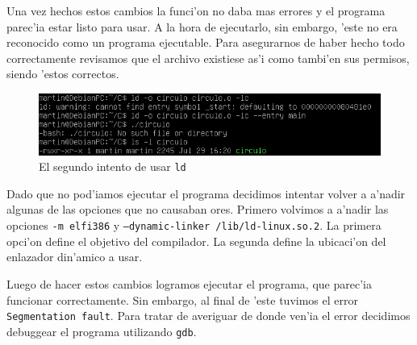\documentclass[11pt]{article}
\begin{document}
		
		Una vez hechos estos cambios la funci'on no daba mas errores y el programa parec'ia estar listo para usar. A la hora de ejecutarlo, sin embargo, 'este no era reconocido como un programa ejecutable. Para asegurarnos de haber hecho todo correctamente revisamos que el archivo existiese as'i como tambi'en sus permisos, siendo 'estos correctos.
		
		\begin{figure}[H]
			\centering
			\includegraphics[width=.9\linewidth]{Images/Seccion 1/S1 parte seis}
			\caption{El segundo intento de usar \texttt{ld}}
			\label{fig:second-ld-attempt}
		\end{figure}
		
		Dado que no pod'iamos ejecutar el programa decidimos intentar volver a a'nadir algunas de las opciones que no causaban ores. Primero volvimos a a'nadir las opciones \texttt{-m elf\textunderscore\/i386} y \texttt{--dynamic-linker /lib/ld-linux.so.2}. La primera opci'on define el objetivo del compilador\footnotemark. La segunda define la ubicaci'on del enlazador din'amico\footnotemark\/ a usar.
		
		
		Luego de hacer estos cambios logramos ejecutar el programa, que parec'ia funcionar correctamente. Sin embargo, al final de 'este tuvimos el error \texttt{Segmentation fault}. Para tratar de averiguar de donde ven'ia el error decidimos debuggear el programa utilizando \texttt{gdb}.
		
\end{document}
